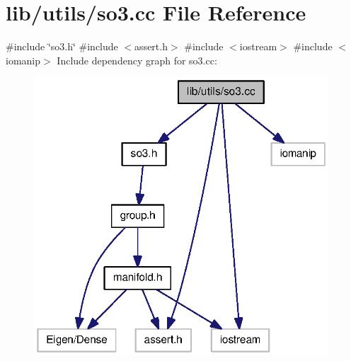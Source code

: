\section{lib/utils/so3.cc \-File \-Reference}
\label{so3_8cc}
{\ttfamily \#include \char`\"{}so3.\-h\char`\"{}}\*
{\ttfamily \#include $<$assert.\-h$>$}\*
{\ttfamily \#include $<$iostream$>$}\*
{\ttfamily \#include $<$iomanip$>$}\*
\-Include dependency graph for so3.\-cc\-:
\nopagebreak
\begin{figure}[H]
\begin{center}
\leavevmode
\includegraphics[width=312pt]{so3_8cc__incl}
\end{center}
\end{figure}
